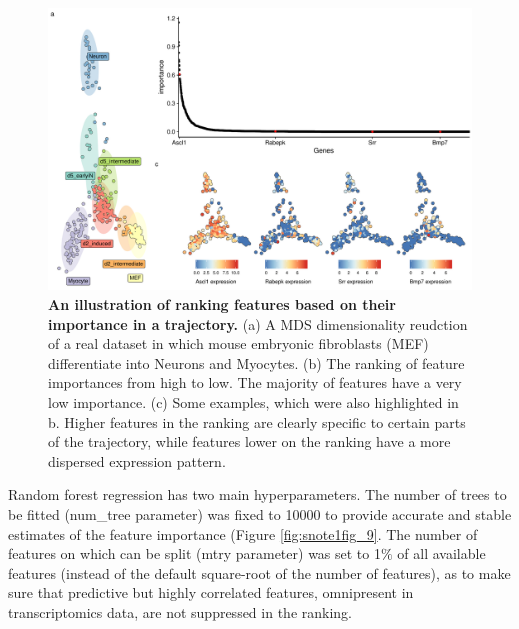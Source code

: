 \begin{figure}
	\centering\includegraphics[width=\linewidth]{fig/dynbenchmark/snote1fig_8.pdf}
	\caption{
		\textbf{An illustration of ranking features based on their importance in a trajectory.} 
		(a) A MDS dimensionality reudction of a real dataset in which mouse embryonic fibroblasts (MEF) differentiate into Neurons and Myocytes. (b) The ranking of feature importances from high to low. The majority of features have a very low importance. (c) Some examples, which were also highlighted in b. Higher features in the ranking are clearly specific to certain parts of the trajectory, while features lower on the ranking have a more dispersed expression pattern.
	}
	\label{fig:snote1fig_8}
\end{figure}

Random forest regression has two main hyperparameters. The number of trees to be fitted (num\_tree parameter) was fixed to 10000 to provide accurate and stable estimates of the feature importance (Figure \ref{fig:snote1fig_9}. The number of features on which can be split (mtry parameter) was set to 1$\%$ of all available features (instead of the default square-root of the number of features), as to make sure that predictive but highly correlated features, omnipresent in transcriptomics data, are not suppressed in the ranking.

